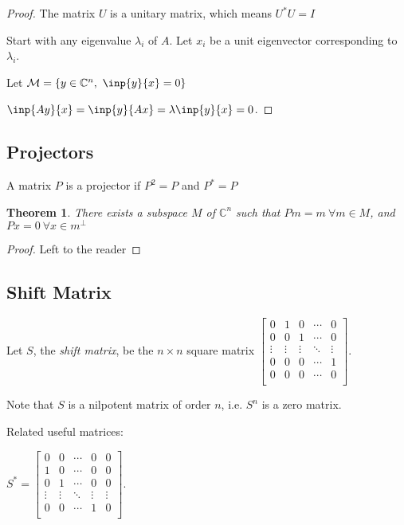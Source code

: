\documentclass[twofold]{article}
\newcommand*\adj[1]{#1^*}
\theoremstyle{plain}
\newtheorem{theorem}{Theorem}
\theoremstyle{definition}
\theoremstyle{remark}
\begin{document}
\begin{proof} 
The matrix \(U\) is a unitary matrix, which means \(\adj{U} U = I\)



Start with any eigenvalue \(\lambda_i\) of \(A\). Let \(x_i\) be a unit eigenvector corresponding to \(\lambda_i\).

Let \(\mathcal{M} = \{y \in \mathbb{C}^n, \ \inp{y}{x} = 0\}\)

\(\inp{Ay}{x} = \inp{y}{Ax} = \lambda \inp{y}{x} = 0\).

\end{proof}
\subsection{Projectors}
A matrix \(P\) is a projector if \(P^2 = P\) and \(\adj{P} = P\)

\begin{theorem} There exists a subspace \(M\) of \(\mathbb{C}^n\) such that \(Pm = m \ \forall m \in M\), and \(P x = 0 \ \forall x \in m^\perp\) \end{theorem}
\begin{proof} Left to the reader \end{proof}

\subsection{Shift Matrix}
Let \(S\), the {\em shift matrix},  be the \(n \times n\) square matrix \( \begin{bmatrix} 
0 & 1 & 0 & \cdots & 0 \\
0 & 0 & 1 & \cdots & 0 \\
\vdots & \vdots & \vdots &\ddots & \vdots \\
0 & 0 & 0 &\cdots & 1 \\
0 & 0 & 0 & \cdots & 0 \\ 
\end{bmatrix}\). 

 Note that \(S\) is a nilpotent matrix of order \(n\), i.e. \(S^n\) is a zero matrix.

Related useful matrices: 

\(\adj{S} =  \begin{bmatrix} 
0 & 0 & \cdots & 0 & 0 \\
1 & 0 & \cdots & 0 & 0 \\
0 & 1 & \cdots & 0 & 0 \\
\vdots & \vdots & \ddots &\vdots & \vdots \\
0 & 0 & \cdots & 1 & 0 \\ 
\end{bmatrix}\). 
\end{document}

